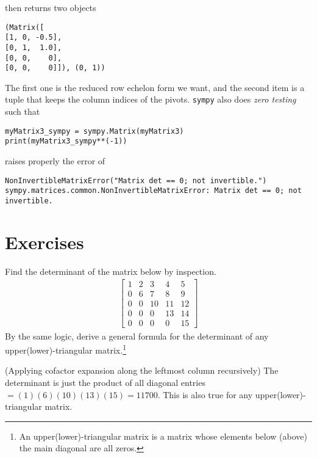 then returns two objects
\begin{lstlisting}
(Matrix([
[1, 0, -0.5],
[0, 1,  1.0],
[0, 0,    0],
[0, 0,    0]]), (0, 1))    
\end{lstlisting}
The first one is the reduced row echelon form we want, and the second item is a tuple that keeps the column indices of the pivots. \verb|sympy| also does \textit{zero testing} such that
\begin{lstlisting}
myMatrix3_sympy = sympy.Matrix(myMatrix3)
print(myMatrix3_sympy**(-1))
\end{lstlisting}
raises properly the error of
\begin{lstlisting}
NonInvertibleMatrixError("Matrix det == 0; not invertible.") sympy.matrices.common.NonInvertibleMatrixError: Matrix det == 0; not invertible. 
\end{lstlisting}

\section{Exercises}

\begin{Exercise}
Find the determinant of the matrix below by inspection.
\begin{align*}
\begin{bmatrix}
1 & 2 & 3 & 4 & 5 \\
0 & 6 & 7 & 8 & 9 \\
0 & 0 & 10 & 11 & 12 \\
0 & 0 & 0 & 13 & 14 \\
0 & 0 & 0 & 0 & 15
\end{bmatrix}    
\end{align*}
By the same logic, derive a general formula for the determinant of any upper(lower)-triangular matrix.\footnote{An upper(lower)-triangular matrix is a matrix whose elements below (above) the main diagonal are all zeros.}
\end{Exercise}
\begin{Answer}
(Applying cofactor expansion along the leftmost column recursively) The determinant is just the product of all diagonal entries $= (1)(6)(10)(13)(15) = 11700$. This is also true for any upper(lower)-triangular matrix.
\end{Answer}

